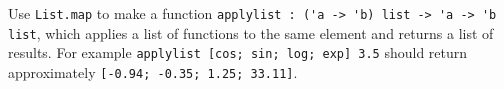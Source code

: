 Use \lstinline{List.map} to make a function \lstinline{applylist : ('a -> 'b) list -> 'a -> 'b list}, which applies a list of functions to the same element and returns a list of results. For example \lstinline{applylist [cos; sin; log; exp] 3.5} should return approximately \lstinline{[-0.94; -0.35; 1.25; 33.11]}.